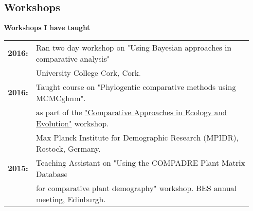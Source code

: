 \documentclass[10pt,a4paper]{article}
\begin{document}
\begin{flushleft}
\section{Workshops}
\raggedright\textbf{Workshops I have taught}\\
\begin{tabular}{ll}
\textbf{2016:} & Ran two day workshop on "Using Bayesian approaches in comparative analysis"\\
&University College Cork, Cork.\\
\textbf{2016:} & Taught course on "Phylogentic comparative methods using MCMCglmm".\\
& as part of the \href{http://www.demogr.mpg.de/En/education_career/international_advanced_studies_in_demography_3279/past_courses_3280/comparative_approaches_in_ecology_and_evolution_4708/default.htm}{"Comparative Approaches in Ecology and Evolution"} workshop.\\
& Max Planck Institute for Demographic Research (MPIDR), Rostock, Germany.\\
\textbf{2015:} & Teaching Assistant on "Using the COMPADRE Plant Matrix Database\\
& for comparative plant demography" workshop. BES annual meeting, Edinburgh.\\
\end{tabular}



\end{flushleft}
\end{document}
